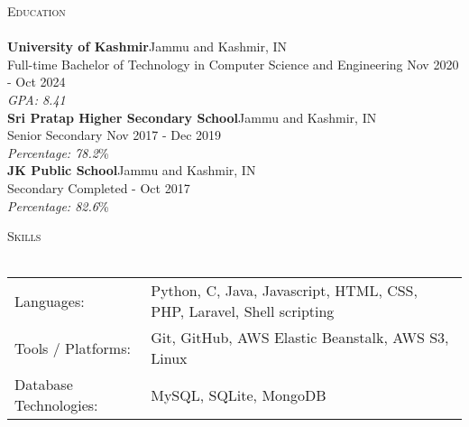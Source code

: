 \documentclass[a4paper]{article}
\newcommand{\lineunder} {
    \vspace*{-8pt} \\
    \hspace*{-18pt} \hrulefill \\
}
\newcommand{\header} [1] {
    {\hspace*{-18pt}\vspace*{6pt} \textsc{#1}}
    \vspace*{-6pt} \lineunder
}
\begin{document}
    \vspace{2mm}

      \header{Education}
      \vspace{2mm}
      \textbf{University of Kashmir}\hfill Jammu and Kashmir, IN\\
Full-time Bachelor of Technology in Computer Science and Engineering \hfill Nov 2020 - Oct 2024\\
{\sl GPA: 8.41}\\
\vspace{2mm}
      \textbf{Sri Pratap Higher Secondary School}\hfill Jammu and Kashmir, IN\\
Senior Secondary \hfill Nov 2017 - Dec 2019\\
{\sl Percentage: 78.2}\%\\
\vspace{2mm}
      \textbf{JK Public School}\hfill Jammu and Kashmir, IN\\
Secondary \hfill Completed - Oct 2017\\
{\sl Percentage: 82.6}\%\\
\vspace{2mm}



%
%
  \header{Skills}
  \vspace{2mm}
  \begin{longtable}{p{4cm}p{12cm}}
  Languages: & Python, C, Java, Javascript, HTML, CSS, PHP, Laravel, Shell scripting \\
  Tools / Platforms: & Git, GitHub, AWS Elastic Beanstalk, AWS S3, Linux \\
  Database Technologies: & MySQL, SQLite, MongoDB \\
  \end{longtable}
  \vspace{1mm}
\end{document}
